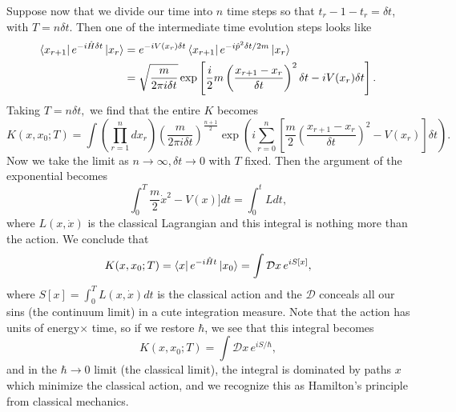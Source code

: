 Suppose now that we divide our time into $n$ time steps so that $t_r-1-t_r=\delta t$, with $T=n\delta t$. Then one of the intermediate time evolution steps looks like
\begin{align*}
    \left< x_{r+1} \right| e^{-i\hat H \delta t}\left| x_r \right>
        &= e^{-iV(x_r)\delta t} \left< x_{r+1} \right| e^{-i\hat p^2 \delta t/2m} \left| x_r \right>\\
        &= \sqrt{\frac{m}{2\pi i \delta t}} \exp\left[\frac{i}{2} m\left(\frac{x_{r+1}-x_r}{\delta t}\right)^2 \delta t - i V(x_r)\delta t\right].
\end{align*}
Taking $T=n\delta t,$ we find that the entire $K$ becomes
\begin{equation}
    K(x,x_0; T) =\int \left( \prod^n_{r=1} dx_r\right) \left(\frac{m}{2\pi i \delta t}\right)^{\frac{n+1}{2}} \exp \left( i\sum_{r=0}^n \left[\frac{m}{2}\left(\frac{x_{r+1}-x_r}{\delta t}\right)^2 -V(x_r)\right]\delta t\right).
\end{equation}
Now we take the limit as $n\to \infty, \delta t\to 0$ with $T$ fixed. Then the argument of the exponential becomes
\begin{equation}
    \int_0^T \frac{m}{2} \dot x^2 - V(x)] dt = \int_0^t L dt,
\end{equation}
where $L(x,\dot x)$ is the classical Lagrangian and this integral is nothing more than the action. We conclude that
\begin{equation}
    K(x,x_0;T) = \left< x \right| e^{-i\hat H t}\left| x_0 \right> = \int \mathcal{D}x\, e^{iS[x]},
\end{equation}
where $S[x]=\int_0^T L(x, \dot x) dt$ is the classical action and the $\mathcal{D}$ conceals all our sins (the continuum limit) in a cute integration measure. Note that the action has units of energy$\times$ time, so if we restore $\hbar$, we see that this integral becomes
\begin{equation}
    K(x,x_0 ; T) = \int \mathcal{D}x\, e^{iS/\hbar},
\end{equation}
and in the $\hbar \to 0$ limit (the classical limit), the integral is dominated by paths $x$ which minimize the classical action, and we recognize this as Hamilton's principle from classical mechanics.